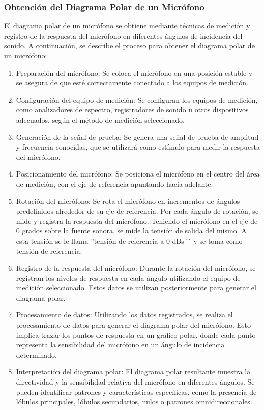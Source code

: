 \documentclass[
	12pt, %
	fleqn, %
	a4paper, %
	oneside, %
]{LegrandOrangeBook}
\begin{document}
\subsubsection*{Obtención del Diagrama Polar de un Micrófono}
El diagrama polar de un micrófono se obtiene mediante técnicas de medición y registro de la respuesta del micrófono en diferentes ángulos de incidencia del sonido. A continuación, se describe el proceso para obtener el diagrama polar de un micrófono:
\begin{enumerate}
  \item Preparación del micrófono: Se coloca el micrófono en una posición estable y se asegura de que esté correctamente conectado a los equipos de medición.

  \item Configuración del equipo de medición: Se configuran los equipos de medición, como analizadores de espectro, registradores de sonido u otros dispositivos adecuados, según el método de medición seleccionado.

  \item Generación de la señal de prueba: Se genera una señal de prueba de amplitud y frecuencia conocidas, que se utilizará como estímulo para medir la respuesta del micrófono.

  \item Posicionamiento del micrófono: Se posiciona el micrófono en el centro del área de medición, con el eje de referencia apuntando hacia adelante.

  \item Rotación del micrófono: Se rota el micrófono en incrementos de ángulos predefinidos alrededor de su eje de referencia. Por cada ángulo de rotación, se mide y registra la respuesta del micrófono. Teniendo el micrófono en el eje de 0 grados sobre la fuente sonora, se mide la tensión de salida del mismo. 
A esta tensión se le llama ''tensión de referencia a 0 dBs´´ y se toma como tensión de referencia.

  \item Registro de la respuesta del micrófono: Durante la rotación del micrófono, se registran los niveles de respuesta en cada ángulo utilizando el equipo de medición seleccionado. Estos datos se utilizan posteriormente para generar el diagrama polar.

  \item Procesamiento de datos: Utilizando los datos registrados, se realiza el procesamiento de datos para generar el diagrama polar del micrófono. Esto implica trazar los puntos de respuesta en un gráfico polar, donde cada punto representa la sensibilidad del micrófono en un ángulo de incidencia determinado.

  \item Interpretación del diagrama polar: El diagrama polar resultante muestra la directividad y la sensibilidad relativa del micrófono en diferentes ángulos. Se pueden identificar patrones y características específicas, como la presencia de lóbulos principales, lóbulos secundarios, nulos o patrones omnidireccionales.

\end{enumerate}
\end{document}
